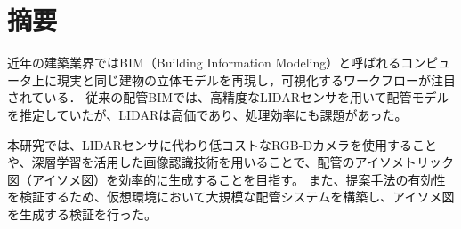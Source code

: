 \section*{摘要}

近年の建築業界ではBIM（Building Information Modeling）と呼ばれるコンピュータ上に現実と同じ建物の立体モデルを再現し，可視化するワークフローが注目されている．
従来の配管BIMでは、高精度なLIDARセンサを用いて配管モデルを推定していたが、LIDARは高価であり、処理効率にも課題があった。

本研究では、LIDARセンサに代わり低コストなRGB-Dカメラを使用することや、深層学習を活用した画像認識技術を用いることで、配管のアイソメトリック図（アイソメ図）を効率的に生成することを目指す。
また、提案手法の有効性を検証するため、仮想環境において大規模な配管システムを構築し、アイソメ図を生成する検証を行った。
